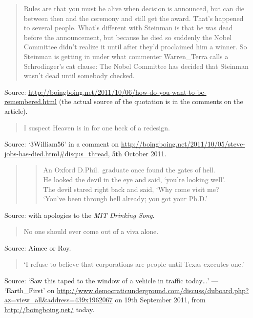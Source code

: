 \documentclass[a4paper]{article}
\begin{document}
\begin{quote}
	Rules are that you must be alive when decision is announced, but can die between then and the
ceremony and still get the award. That's happened to several people. What's different with Steinman
is that he was dead before the announcement, but because he died so suddenly the Nobel Committee
didn't realize it until after they'd proclaimed him a winner. So Steinman is getting in under what
commenter Warren\_Terra calls a Schrodinger's cat clause: The Nobel Committee has decided that
Steinman wasn't dead until somebody checked.
\end{quote}
Source: \url{http://boingboing.net/2011/10/06/how-do-you-want-to-be-remembered.html} (the actual
source of the quotation is in the comments on the article).
\medskip

\begin{quote}
	I suspect Heaven is in for one heck of a redesign.
\end{quote}
Source: `3William56' in a comment on
\url{http://boingboing.net/2011/10/05/steve-jobs-has-died.html#disqus_thread}, 5th October 2011.
\medskip

\begin{quote}
	\begin{verse}
		\centering
		An Oxford D.Phil.\ graduate once found the gates of hell. \\
		He looked the devil in the eye and said, `you're looking well'. \\
		The devil stared right back and said, `Why come visit me? \\
		`You've been through hell already; you got your Ph.D.'
	\end{verse}
\end{quote}
Source: with apologies to the \emph{MIT Drinking Song}.
\medskip

\begin{quote}
	No one should ever come out of a viva alone.
\end{quote}
Source: Aimee or Roy.
\medskip

\begin{quote}
	`I refuse to believe that corporations are people until Texas executes one.'
\end{quote}
Source: `Saw this taped to the window of a vehicle in traffic today\ldots' --- `Earth\_First' on
\url{http://www.democraticunderground.com/discuss/duboard.php?az=view_all&address=439x1962067} on
19th September 2011, from \url{http://boingboing.net/} today.
\medskip
\end{document}
